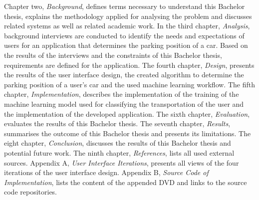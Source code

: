 Chapter two, \textit{Background}, defines terms necessary to understand this Bachelor thesis, explains the methodology applied for analysing the problem and discusses related systems as well as related academic work.
In the third chapter, \textit{Analysis}, background interviews are conducted to identify the needs and expectations of users for an application that determines the parking position of a car. Based on the results of the interviews and the constraints of this Bachelor thesis, requirements are defined for the application.
The fourth chapter, \textit{Design}, presents the results of the user interface design, the created algorithm to determine the parking position of a user's car and the used machine learning workflow.
The fifth chapter, \textit{Implementation}, describes the implementation of the training of the machine learning model used for classifying the transportation of the user and the implementation of the developed application. 
The sixth chapter, \textit{Evaluation}, evaluates the results of this Bachelor thesis.
The seventh chapter, \textit{Results}, summarises the outcome of this Bachelor thesis and presents its limitations. 
The eight chapter, \textit{Conclusion}, discusses the results of this Bachelor thesis and potential future work.
The ninth chapter, \textit{References}, lists all used external sources. 
Appendix A, \textit{User Interface Iterations}, presents all views of the four iterations of the user interface design.
Appendix B, \textit{Source Code of Implementation}, lists the content of the appended DVD and links to the source code repositories. 